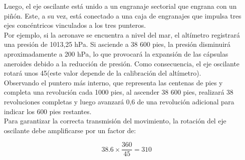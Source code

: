 Luego, el eje oscilante está unido a un engranaje sectorial que engrana con un piñón. Este, a su vez, está conectado a una caja de engranajes que impulsa tres ejes concéntricos vinculados a los tres punteros.\\

Por ejemplo, si la aeronave se encuentra a nivel del mar, el altímetro registrará una presión de 1013,25 hPa. Si asciende a 38 600 pies, la presión disminuirá aproximadamente a 200 hPa, lo que provocará la expansión de las cápsulas aneroides debido a la reducción de presión. Como consecuencia, el eje oscilante rotará unos 45\textdegree (este valor depende de la calibración del altímetro).\\

Observando el puntero más interno, que representa las centenas de pies y completa una revolución cada 1000 pies, al ascender 38 600 pies, realizará 38 revoluciones completas y luego avanzará 0,6 de una revolución adicional para indicar los 600 pies restantes.\\

Para garantizar la correcta transmisión del movimiento, la rotación del eje oscilante debe amplificarse por un factor de:

\[
38.6 \times \frac{360}{45} = 310
\]

